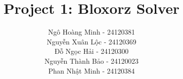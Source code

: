 \documentclass[12pt,a4paper]{article}
\title{Project 1: Bloxorz Solver}
\author{
    \centering
    \begin{tabular}{c}
        Ngô Hoàng Minh - 24120381 \\
        Nguyễn Xuân Lộc - 24120369 \\
        Đỗ Ngọc Hải - 24120300 \\
        Nguyễn Thành Bảo - 24120023 \\
        Phan Nhật Minh - 24120384 \\
    \end{tabular}
}
\newif\ifisprojectreport
\begin{document}
\ifisprojectreport
    \hypersetup{pageanchor=false}
    \makecoverpage
    \hypersetup{pageanchor=true}
    
    \pagestyle{plain}
    \pagenumbering{roman}
    \tableofcontents
    \newpage
    
    \pagestyle{fancy}
    \pagenumbering{arabic}
\else
    \pagestyle{fancy}
    \makeassignmentheader
\fi















\newpage
\nocite{*}


\end{document}
